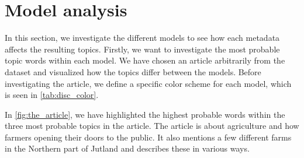 \section{Model analysis}\label{sec:discussion}
In this section, we investigate the different models to see how each metadata affects the resulting topics.
Firstly, we want to investigate the most probable topic words within each model.
We have chosen an article arbitrarily from the dataset and visualized how the topics differ between the models. 
Before investigating the article, we define a specific color scheme for each model, which is seen in \autoref{tab:disc_color}.

In \autoref{fig:the_article}, we have highlighted the highest probable words within the three most probable topics in the article.
The article is about agriculture and how farmers opening their doors to the public. 
It also mentions a few different farms in the Northern part of Jutland and describes these in various ways.

